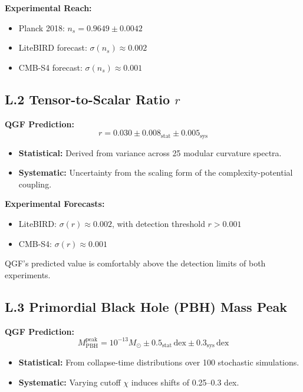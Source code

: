 \documentclass[11pt]{article}
\begin{document}
\textbf{Experimental Reach:}
\begin{itemize}
\item Planck 2018: \( n_s = 0.9649 \pm 0.0042 \) \cite{Planck2018}
\item LiteBIRD forecast: \( \sigma(n_s) \approx 0.002 \) \cite{LiteBIRD2023}
\item CMB-S4 forecast: \( \sigma(n_s) \approx 0.001 \) \cite{CMB-S42022}
\end{itemize}

\subsection*{L.2 Tensor-to-Scalar Ratio \( r \)}

\textbf{QGF Prediction:}
\[
r = 0.030 \pm 0.008_{\mathrm{stat}} \pm 0.005_{\mathrm{sys}}
\]

\begin{itemize}
\item \textbf{Statistical:} Derived from variance across 25 modular curvature spectra.
\item \textbf{Systematic:} Uncertainty from the scaling form of the complexity-potential coupling.
\end{itemize}

\textbf{Experimental Forecasts:}
\begin{itemize}
\item LiteBIRD: \( \sigma(r) \approx 0.002 \), with detection threshold \( r > 0.001 \)
\item CMB-S4: \( \sigma(r) \approx 0.001 \) \cite{CMB-S42022}
\end{itemize}

QGF's predicted value is comfortably above the detection limits of both experiments.

\subsection*{L.3 Primordial Black Hole (PBH) Mass Peak}

\textbf{QGF Prediction:}
\[
M_{\mathrm{PBH}}^{\mathrm{peak}} = 10^{-13} M_\odot \pm 0.5_{\mathrm{stat}}\, \mathrm{dex} \pm 0.3_{\mathrm{sys}}\, \mathrm{dex}
\]

\begin{itemize}
\item \textbf{Statistical:} From collapse-time distributions over 100 stochastic simulations.
\item \textbf{Systematic:} Varying cutoff \( \chi \) induces shifts of 0.25–0.3 dex.
\end{itemize}
\end{document}
